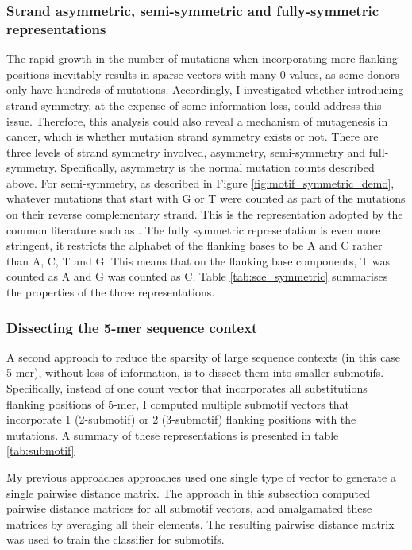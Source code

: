 \subsubsection{Strand asymmetric, semi-symmetric and fully-symmetric representations}
The rapid growth in the number of mutations when incorporating more flanking positions inevitably results in sparse vectors with many 0 values, as some donors only have hundreds of mutations. Accordingly, I investigated whether introducing strand symmetry, at the expense of some information loss, could address this issue. Therefore, this analysis could also reveal a mechanism of mutagenesis in cancer, which is whether mutation strand symmetry exists or not. There are three levels of strand symmetry involved, asymmetry, semi-symmetry and full-symmetry. Specifically, asymmetry is the normal mutation counts described above. For semi-symmetry, as described in Figure \ref{fig:motif_symmetric_demo}, whatever mutations that start with G or T were counted as part of the mutations on their reverse complementary strand. This is the representation adopted by the common literature such as \citet{Jiao2020}. The fully symmetric representation is even more stringent, it restricts the alphabet of the flanking bases to be A and C rather than A, C, T and G. This means that on the flanking base components, T was counted as A and G was counted as C. Table \ref{tab:sce_symmetric} summarises the properties of the three representations.



\subsubsection{Dissecting the 5-mer sequence context}
A second approach to reduce the sparsity of large sequence contexts (in this case 5-mer), without loss of information, is to dissect them into smaller submotifs. Specifically, instead of one count vector that incorporates all substitutions flanking positions of 5-mer, I computed multiple submotif vectors that incorporate 1 (2-submotif) or 2 (3-submotif) flanking positions with the mutations. A summary of these representations is presented in table \ref{tab:submotif}



My previous approaches approaches used one single type of vector to generate a single pairwise distance matrix. The approach in this subsection computed pairwise distance matrices for all submotif vectors, and amalgamated these matrices by averaging all their elements. The resulting pairwise distance matrix was used to train the classifier for submotifs. 

